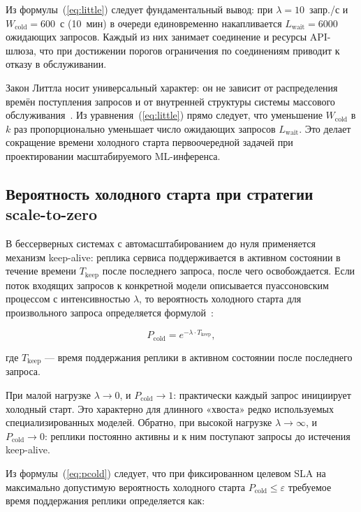 Из формулы~(\ref{eq:little}) следует фундаментальный вывод: при $\lambda = 10$~запр./с и $W_{\mathrm{cold}} = 600$~с (10~мин) в очереди единовременно накапливается $L_{\mathrm{wait}} = 6000$ ожидающих запросов. Каждый из них занимает соединение и ресурсы API-шлюза, что при достижении порогов ограничения по соединениям приводит к отказу в обслуживании.

Закон Литтла носит универсальный характер: он не зависит от распределения времён поступления запросов и от внутренней структуры системы массового обслуживания~\cite{little1961}. Из уравнения~(\ref{eq:little}) прямо следует, что уменьшение $W_{\mathrm{cold}}$ в $k$ раз пропорционально уменьшает число ожидающих запросов $L_{\mathrm{wait}}$. Это делает сокращение времени холодного старта первоочередной задачей при проектировании масштабируемого ML-инференса.

\subsection{Вероятность холодного старта при стратегии scale-to-zero}

В бессерверных системах с автомасштабированием до нуля применяется механизм keep-alive: реплика сервиса поддерживается в активном состоянии в течение времени $T_{\mathrm{keep}}$ после последнего запроса, после чего освобождается. Если поток входящих запросов к конкретной модели описывается пуассоновским процессом с интенсивностью $\lambda$, то вероятность холодного старта для произвольного запроса определяется формулой~\cite{little1961}:

\begin{equation}
P_{\mathrm{cold}} = e^{-\lambda \cdot T_{\mathrm{keep}}},
\label{eq:pcold}
\end{equation}

где $T_{\mathrm{keep}}$ --- время поддержания реплики в активном состоянии после последнего запроса.

При малой нагрузке $\lambda \to 0$, и $P_{\mathrm{cold}} \to 1$: практически каждый запрос инициирует холодный старт. Это характерно для длинного «хвоста» редко используемых специализированных моделей. Обратно, при высокой нагрузке $\lambda \to \infty$, и $P_{\mathrm{cold}} \to 0$: реплики постоянно активны и к ним поступают запросы до истечения keep-alive.

Из формулы~(\ref{eq:pcold}) следует, что при фиксированном целевом SLA на максимально допустимую вероятность холодного старта $P_{\mathrm{cold}} \leq \varepsilon$ требуемое время поддержания реплики определяется как:

